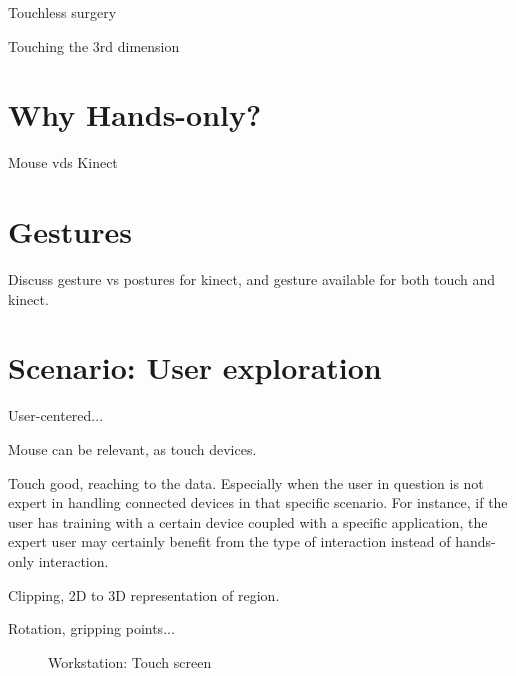 \documentclass[review,journal]{vgtc}         %
\begin{document}
Touchless surgery \cite{Mentis:2012:IPI:2207676.2208536}

Touching the 3rd dimension \cite{DBLP:journals/dagstuhl-reports/KeefeKSR12}

\section{Why Hands-only?}

Mouse vds Kinect \cite{doi:10.1117/12.2006994}

\section{Gestures}

Discuss gesture vs postures for kinect, and gesture available for both touch and kinect.

\section{Scenario: User exploration}

User-centered...

Mouse can be relevant, as touch devices.

Touch good, reaching to the data. Especially when the user in question is not expert in handling connected devices in that specific scenario. For instance, if the user has training with a certain device coupled with a specific application, the expert user may certainly benefit from the type of interaction instead of hands-only interaction.

Clipping, 2D to 3D representation of region.

Rotation, gripping points...

\begin{figure}[htb]
	\centering
	\caption{Workstation: Touch screen}
	\label{img:touch_workstation}
\end{figure}
\end{document}
